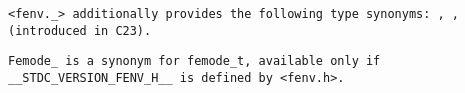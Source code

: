 \tt{<fenv._>} additionally provides the following type synonyms:
, ,  (introduced in C23).

\note \tt{Femode_} is a synonym for \tt{femode_t},
available only if \tt{__STDC_VERSION_FENV_H__} is defined by \tt{<fenv.h>}.
